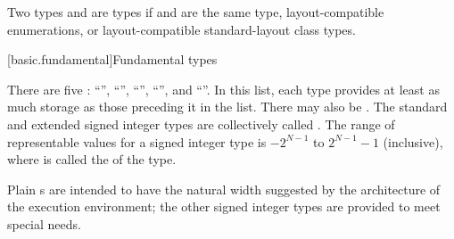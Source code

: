 \pnum
{}%
Two types   and   are
 types
if  and  are the same type,
layout-compatible enumerations, or
layout-compatible standard-layout class types.

[basic.fundamental]{Fundamental types}

\pnum
{}%
%
There are five :
%
%
%
%
%
``'', ``'', ``'',
``'', and ``''. In
this list, each type provides at least as much storage as those
preceding it in the list.
%
%
There may also be 
.
The standard and extended signed integer types are collectively called
.
The range of representable values for a signed integer type is
$-2^{N-1}$ to $2^{N-1}-1$ (inclusive),
where  is called the  of the type.
%
\begin{note}
Plain s are intended to have
the natural width suggested by the architecture of the execution environment;
the other signed integer types are provided to meet special needs.
\end{note}

